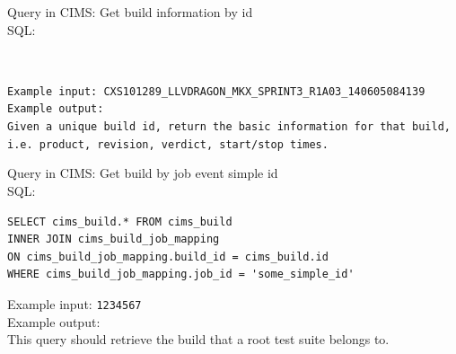 \label{q:getbuildinfo}
Query in CIMS: Get build information by id \\
SQL: 
\begin{verbatim}

\end{verbatim}
{\tt  \\
Example input: {\tt CXS101289\_LLVDRAGON\_MKX\_SPRINT3\_R1A03\_140605084139 }  \\
Example output: \\
Given a unique build id, return the basic information for that build, i.e. product, revision, verdict, start/stop times.

\label{q:getbuildforroot}
Query in CIMS: Get build by job event simple id \\
SQL: 
\begin{verbatim}
SELECT cims_build.* FROM cims_build
INNER JOIN cims_build_job_mapping
ON cims_build_job_mapping.build_id = cims_build.id   
WHERE cims_build_job_mapping.job_id = 'some_simple_id'
\end{verbatim} 
Example input: {\tt 1234567 }  \\
Example output: \\
This query should retrieve the build that a root test suite belongs to.




}
